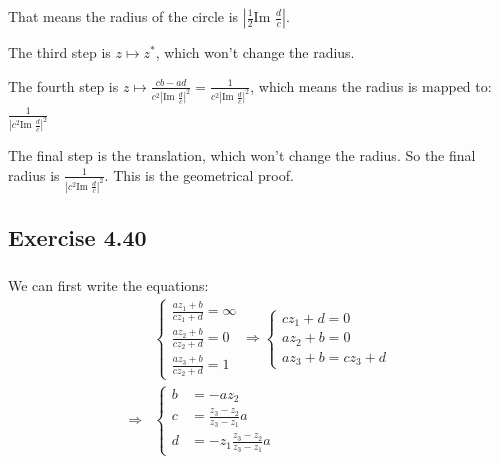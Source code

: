 \documentclass[]{ctexart}
\begin{document}
		That means  the radius of the circle is $|\frac{1}{2}\text{Im }\frac{d}{c}|$. 
		
		The third step is $z\mapsto z^*$, which won't change the radius. 
		
		The fourth step is $z\mapsto \frac{cb-ad}{c^2|\text{Im }\frac{d}{c}|^2}=\frac{1}{c^2|\text{Im }\frac{d}{c}|^2}$, which means the radius is mapped to: $\frac{1}{|c^2\text{Im }\frac{d}{c}|^2}$
		
		The final step is the translation, which won't change the radius. So the final radius is $\frac{1}{|c^2\text{Im }\frac{d}{c}|^2}$. This is the geometrical proof. 
		
	\subsection{Exercise 4.40}
		\subsubsection{}
		We can first write the equations:
			\begin{equation*}
			\begin{aligned}
				&\begin{cases}
					\frac{az_1+b}{cz_1+d}=\infty \\
					\frac{az_2+b}{cz_2+d}=0\\
					\frac{az_3+b}{cz_2+d}=1
				\end{cases}
				\Rightarrow 
				\begin{cases}
					cz_1+d=0\\
					az_2+b=0\\
					az_3+b=cz_3+d
				\end{cases}\\
				\Rightarrow &\begin{cases}
					b&=-az_2\\
					c&=\frac{z_3-z_2}{z_3-z_1}a\\
					d&=-z_1\frac{z_3-z_2}{z_3-z_1}a
				\end{cases}
			\end{aligned}
			\end{equation*}
		
\end{document}
